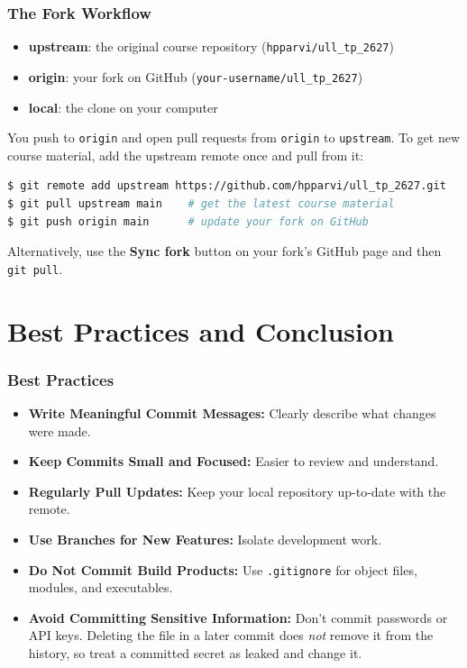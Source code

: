 \begin{frame}[fragile]
	\frametitle{The Fork Workflow}
	\begin{itemize}
		\item \textbf{upstream}: the original course repository (\texttt{hpparvi/ull\_tp\_2627})
		\item \textbf{origin}: your fork on GitHub (\texttt{your-username/ull\_tp\_2627})
		\item \textbf{local}: the clone on your computer
	\end{itemize}
	You push to \texttt{origin} and open pull requests from \texttt{origin} to \texttt{upstream}. To get new course material, add the upstream remote once and pull from it:
\begin{lstlisting}[language=bash]
$ git remote add upstream https://github.com/hpparvi/ull_tp_2627.git
$ git pull upstream main    # get the latest course material
$ git push origin main      # update your fork on GitHub
\end{lstlisting}
	Alternatively, use the \textbf{Sync fork} button on your fork's GitHub page and then \texttt{git pull}.
\end{frame}

\section{Best Practices and Conclusion}

\begin{frame}
	\frametitle{Best Practices}
	\begin{itemize}
		\item \textbf{Write Meaningful Commit Messages:} Clearly describe what changes were made.
		\item \textbf{Keep Commits Small and Focused:} Easier to review and understand.
		\item \textbf{Regularly Pull Updates:} Keep your local repository up-to-date with the remote.
		\item \textbf{Use Branches for New Features:} Isolate development work.
		\item \textbf{Do Not Commit Build Products:} Use \texttt{.gitignore} for object files, modules, and executables.
		\item \textbf{Avoid Committing Sensitive Information:} Don't commit passwords or API keys. Deleting the file in a later commit does \emph{not} remove it from the history, so treat a committed secret as leaked and change it.
	\end{itemize}
\end{frame}

